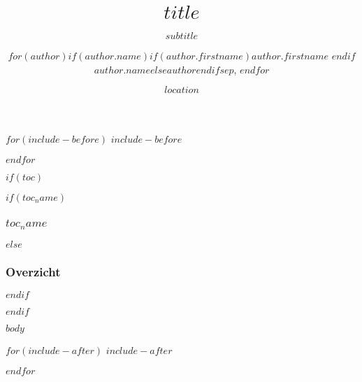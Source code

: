 \documentclass[
  hyperref={colorlinks=true,citecolor=link.colour,linkcolor=link.colour,urlcolor=link.colour},
  $if(fontsize)$$fontsize$$else$10pt$endif$,
  xetex,
  noamsthm$if(handout)$, handout$endif$$if(aspect)$, aspectratio=$aspect$ $endif$
]{beamer}
\title{$title$}
\subtitle{$subtitle$}
\author{
$for(author)$$if(author.name)$$if(author.firstname)$$author.firstname$ $endif$$author.name$$else$$author$$endif$$sep$, $endfor$
}
\institute{$institute$}
\date{$location$}
\date{}
\begin{document}
\begin{frame}[plain, label=intro, noframenumbering]
  \titlepage
\end{frame}

$for(include-before)$
$include-before$

$endfor$

$if(toc)$
\begin{frame}
$if(toc_name)$
  \frametitle{$toc_name$}
$else$
  \frametitle{Overzicht}
$endif$
	\tableofcontents
\end{frame}
$endif$

$body$

$for(include-after)$
$include-after$

$endfor$
\end{document}
